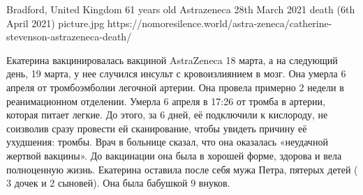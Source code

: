           {Bradford, United Kingdom}
          {61 years old}
          {Astrazeneca}
          {28th March 2021}
          {death (6th April 2021)}
          {picture.jpg}
          {https://nomoresilence.world/astra-zeneca/catherine-stevenson-astrazeneca-death/}
          {

Екатерина вакцинировалась вакциной AstraZeneca 18 марта, а на следующий день, 19
марта, у нее случился инсульт с кровоизлиянием в мозг. Она умерла 6 апреля от
тромбоэмболии легочной артерии. Она провела примерно 2 недели в реанимационном
отделении. Умерла 6 апреля в 17:26 от тромба в артерии, которая питает
легкие. До этого, за 6 дней, её подключили к кислороду, не соизволив сразу
провести ей сканирование, чтобы увидеть причину её ухудшения: тромбы. Врач в
больнице сказал, что она оказалась «неудачной жертвой вакцины». До вакцинации
она была в хорошей форме, здорова и вела полноценную жизнь. Екатерина оставила
после себя мужа Петра, пятерых детей ( 3 дочек и 2 сыновей). Она была бабушкой 9
внуков.

}
